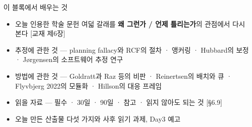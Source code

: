 \begin{frame}{이 블록에서 배우는 것}
\begin{itemize}
\item 오늘 인용한 학술 문헌 여덟 갈래를 \textbf{왜 그런가 / 언제 틀리는가}의 관점에서 다시 본다 [교재 제6장]
\item 추정에 관한 것 — planning fallacy와 RCF의 절차 · 앵커링 · Hubbard의 보정 · Jørgensen의 소프트웨어 추정 연구
\item 방법에 관한 것 — Goldratt과 Raz 등의 비판 · Reinertsen의 배치와 큐 · Flyvbjerg 2022의 모듈화 · Hillson의 대응 프레임
\item 읽을 자료 — 필수 · 30일 · 90일 · 참고 · 읽지 않아도 되는 것 [§6.9]
\item 오늘 만든 산출물 다섯 가지와 사후 읽기 과제, Day3 예고
\end{itemize}
\end{frame}

